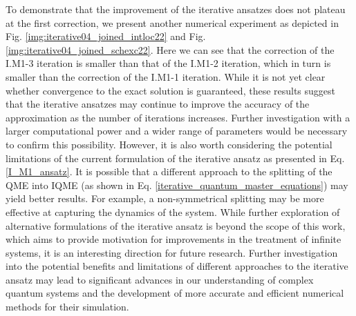 To demonstrate that the improvement of the iterative ansatzes does not plateau at the first correction, we present another numerical experiment as depicted in Fig. \ref{img:iterative04_joined_intloc22} and Fig. \ref{img:iterative04_joined_schexc22}. Here we can see that the correction of the I.M1-3 iteration is smaller than that of the I.M1-2 iteration, which in turn is smaller than the correction of the I.M1-1 iteration. While it is not yet clear whether convergence to the exact solution is guaranteed, these results suggest that the iterative ansatzes may continue to improve the accuracy of the approximation as the number of iterations increases. Further investigation with a larger computational power and a wider range of parameters would be necessary to confirm this possibility. However, it is also worth considering the potential limitations of the current formulation of the iterative ansatz as presented in Eq. \ref{I_M1_ansatz}. It is possible that a different approach to the splitting of the QME into IQME (as shown in Eq. \ref{iterative_quantum_master_equations}) may yield better results. For example, a non-symmetrical splitting may be more effective at capturing the dynamics of the system. While further exploration of alternative formulations of the iterative ansatz is beyond the scope of this work, which aims to provide motivation for improvements in the treatment of infinite systems, it is an interesting direction for future research. Further investigation into the potential benefits and limitations of different approaches to the iterative ansatz may lead to significant advances in our understanding of complex quantum systems and the development of more accurate and efficient numerical methods for their simulation. 

